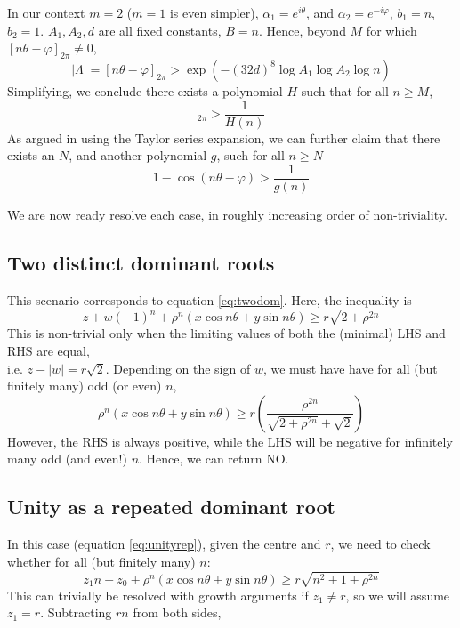 In our context $m=2$ ($m=1$ is even simpler), $\alpha_1 = e^{i\theta}$, and $\alpha_2 = e^{-i\varphi}$, $b_1 = n$, $b_2 = 1$. $A_1, A_2, d$ are all fixed constants, $B = n$. Hence, beyond $M$ for which $[n\theta - \varphi]_{2\pi} \ne 0$,
\begin{equation}
|\Lambda| = [n\theta - \varphi]_{2\pi} > \exp(-(32d)^8 \log A_1 \log A_2 \log n)
\end{equation}
Simplifying, we conclude there exists a polynomial $H$ such that for all $n \ge M$,
\begin{equation}
[n\theta - \varphi]_{2\pi} > \frac{1}{H(n)}
\end{equation}
As argued in \cite{joeljames3} using the Taylor series expansion, we can further claim that there exists an $N$, and another polynomial $g$, such for all $n \ge N$
\begin{equation}
\label{eq:baker}
1 - \cos(n\theta - \varphi) > \frac{1}{g(n)}
\end{equation}

We are now ready resolve each case, in roughly increasing order of non-triviality. 

\subsection{Two distinct dominant roots}
This scenario corresponds to equation \ref{eq:twodom}. Here, the inequality is
\begin{equation}
z + w(-1)^n + \rho^n(x \cos n\theta + y \sin n\theta) \ge r\sqrt{2 + \rho^{2n}}
\end{equation}
This is non-trivial only when the limiting values of both the (minimal) LHS and RHS are equal, \\i.e. $z - |w|= r\sqrt{2}$. Depending on the sign of $w$, we must have have for all (but finitely many) odd (or even) $n$,
\begin{equation}
\rho^n(x \cos n\theta + y \sin n\theta) \ge r\left(\frac{\rho^{2n}}{\sqrt{2 + \rho^{2n}} + \sqrt{2}}\right)
\end{equation}
However, the RHS is always positive, while the LHS will be negative for infinitely many odd (and even!) $n$. Hence, we can return NO.

\subsection{Unity as a repeated dominant root}
In this case (equation \ref{eq:unityrep}), given the centre and $r$, we need to check whether for all (but finitely many) $n$:
\begin{equation}
z_1 n + z_0 + \rho^n (x \cos n\theta + y \sin n \theta) \ge r\sqrt{n^2 + 1 + \rho^{2n}}
\end{equation}
This can trivially be resolved with growth arguments if $z_1 \ne r$, so we will assume $z_1 = r$. Subtracting $rn$ from both sides,

